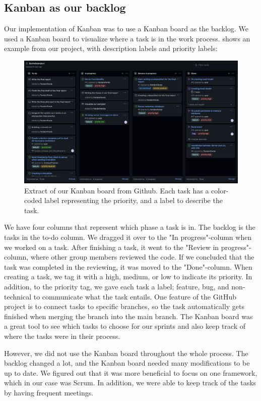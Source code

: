 \subsection{Kanban as our backlog}
Our implementation of Kanban was to use a Kanban board as the backlog. We used a Kanban board to visualize where a task is in the work process.  shows an example from our project, with description labels and priority labels:
\begin{figure}[h!]
	\centering
	\includegraphics[width=1\linewidth]{figures/kanban_screenshot}
	\caption[kanban screenshot]{Extract of our Kanban board from Github. Each task has a color-coded label representing the priority, and a label to describe the task.}
	\label{fig:kanbanscreenshot}
\end{figure}

We have four columns that represent which phase a task is in. The backlog is the tasks in the to-do column. We dragged it over to the "In progress"-column when we worked on a task. After finishing a task, it went to the "Review in progress"-column, where other group members reviewed the code. If we concluded that the task was completed in the reviewing, it was moved to the "Done"-column. When creating a task, we tag it with a high, medium, or low to indicate its priority. In addition, to the priority tag, we gave each task a label; feature, bug, and non-technical to communicate what the task entails. One feature of the GitHub project is to connect tasks to specific branches, so the task automatically gets finished when merging the branch into the main branch. The Kanban board was a great tool to see which tasks to choose for our sprints and also keep track of where the tasks were in their process. 

However, we did not use the Kanban board throughout the whole process. The backlog changed a lot, and the Kanban board needed many modifications to be up to date. We figured out that it was more beneficial to focus on one framework, which in our case was Scrum. In addition, we were able to keep track of the tasks by having frequent meetings. 